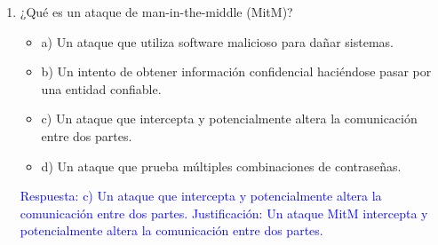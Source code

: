 \documentclass[a4paper]{article}
\begin{document}
\begin{enumerate}
    

    \item ¿Qué es un ataque de man-in-the-middle (MitM)?
    \begin{itemize}
        \item a) Un ataque que utiliza software malicioso para dañar sistemas.
        \item b) Un intento de obtener información confidencial haciéndose pasar por una entidad confiable.
        \item c) Un ataque que intercepta y potencialmente altera la comunicación entre dos partes.
        \item d) Un ataque que prueba múltiples combinaciones de contraseñas.
    \end{itemize}
    \textcolor{blue}{Respuesta: c) Un ataque que intercepta y potencialmente altera la comunicación entre dos partes. Justificación: Un ataque MitM intercepta y potencialmente altera la comunicación entre dos partes.}
    \vspace{1cm}
\end{enumerate}


  
\end{document}
